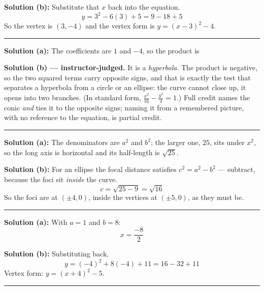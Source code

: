 \documentclass[12pt]{article}
\begin{document}
\textbf{Solution (b):} Substitute that $x$ back into the equation.
\[ y = 3^2 - 6(3) + 5 = 9 - 18 + 5 \]
So the vertex is $(3, -4)$ and the vertex form is $y = (x-3)^2 - 4$.

\vspace{0.2cm}\noindent\rule{\linewidth}{0.2pt}


\textbf{Solution (a):} The coefficients are $1$ and $-4$, so the product is 

\vspace{0.15cm}
\textbf{Solution (b) --- instructor-judged.} It is a \emph{hyperbola}. The product is
negative, so the two squared terms carry opposite signs, and that is exactly the test that
separates a hyperbola from a circle or an ellipse: the curve cannot close up, it opens into
two branches. (In standard form, $\frac{x^2}{16} - \frac{y^2}{4} = 1$.) Full credit names the
conic \emph{and} ties it to the opposite signs; naming it from a remembered picture, with no
reference to the equation, is partial credit.

\vspace{0.2cm}\noindent\rule{\linewidth}{0.2pt}


\textbf{Solution (a):} The denominators are $a^2$ and $b^2$; the larger one, $25$, sits under
$x^2$, so the long axis is horizontal and its half-length is $\sqrt{25}$. 

\textbf{Solution (b):} For an ellipse the focal distance satisfies $c^2 = a^2 - b^2$
--- subtract, because the foci sit \emph{inside} the curve.
\[ c = \sqrt{25 - 9} = \sqrt{16} \]
So the foci are at $(\pm 4, 0)$, inside the vertices at $(\pm 5, 0)$, as they must be.

\vspace{0.2cm}\noindent\rule{\linewidth}{0.2pt}


\textbf{Solution (a):} With $a = 1$ and $b = 8$:
\[ x = \frac{-8}{2} \]

\textbf{Solution (b):} Substituting back,
\[ y = (-4)^2 + 8(-4) + 11 = 16 - 32 + 11 \]
Vertex form: $y = (x + 4)^2 - 5$.

\vspace{0.2cm}\noindent\rule{\linewidth}{0.2pt}
\end{document}
